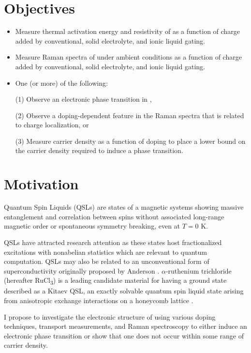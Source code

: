 \documentclass[11pt]{article}
\begin{document}
\begin{multicols}{2}


\section{Objectives}
\begin{itemize}
	\item Measure thermal activation energy and resistivity of \rucl as a function of charge added by conventional, solid electrolyte, and ionic liquid gating.
	\item Measure Raman spectra of \rucl under ambient conditions as a function of charge added by conventional, solid electrolyte, and ionic liquid gating.
	\item One (or more) of the following:
	
	(1) Observe an electronic phase transition in \ruclnospace, 
	
	(2) Observe a doping-dependent feature in the Raman spectra that is related to charge localization, or 
	
	(3) Measure carrier density as a function of doping to place a lower bound on the carrier density required to induce a phase transition.
\end{itemize}

\section{Motivation}
Quantum Spin Liquids (QSLs) are states of a magnetic systems showing massive entanglement and correlation between spins without associated long-range magnetic order or spontaneous symmetry breaking, even at $T = 0$ K. 

QSLs have attracted research attention as these states host fractionalized excitations with nonabelian statistics \cite{Balents2010} which are relevant to quantum computation. QSLs may also be related to an unconventional form of superconductivity originally proposed by Anderson \cite{Lee2008}. $\alpha$-ruthenium trichloride (hereafter RuCl\textsubscript{3}) is a leading candidate material for having a ground state described as a Kitaev QSL, an exactly solvable quantum spin liquid state arising from anisotropic exchange interactions on a honeycomb lattice \cite{Kitaev2006}.

I propose to investigate the electronic structure of \rucl using various doping techniques, transport measurements, and Raman spectroscopy to either induce an electronic phase transition or show that one does not occur within some range of carrier density.


\end{multicols}
\end{document}
